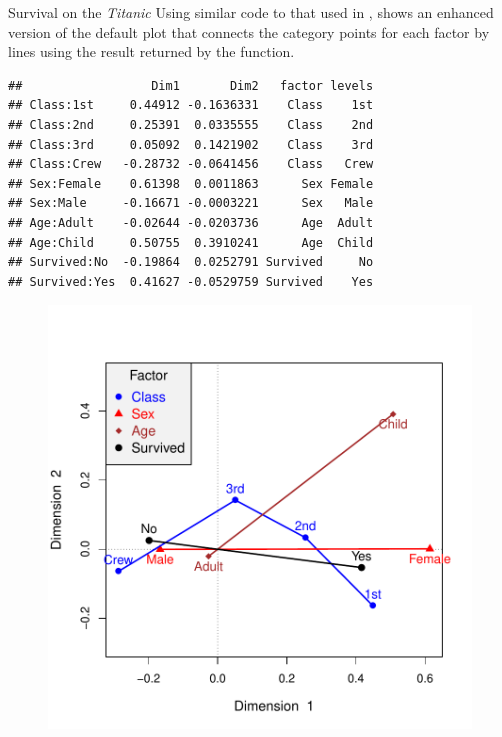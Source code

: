 \documentclass[11pt]{book}
\renewenvironment{knitrout}{\small\renewcommand{\baselinestretch}{.85}}{} %
\begin{document}
\begin{Example}[titanic2]{Survival on the \emph{Titanic}}
Using similar code to that used in ,
 shows an enhanced version of the default plot that connects
the category points for each factor by lines using the result returned by
the  function.
\begin{knitrout}
\color{fgcolor}\begin{kframe}
\begin{alltt}
 \hlkwb{<-} 
\end{alltt}
\end{kframe}
\end{knitrout}

\begin{knitrout}
\color{fgcolor}\begin{kframe}
\begin{verbatim}
##                  Dim1       Dim2   factor levels
## Class:1st     0.44912 -0.1636331    Class    1st
## Class:2nd     0.25391  0.0335555    Class    2nd
## Class:3rd     0.05092  0.1421902    Class    3rd
## Class:Crew   -0.28732 -0.0641456    Class   Crew
## Sex:Female    0.61398  0.0011863      Sex Female
## Sex:Male     -0.16671 -0.0003221      Sex   Male
## Age:Adult    -0.02644 -0.0203736      Age  Adult
## Age:Child     0.50755  0.3910241      Age  Child
## Survived:No  -0.19864  0.0252791 Survived     No
## Survived:Yes  0.41627 -0.0529759 Survived    Yes
\end{verbatim}
\end{kframe}\begin{figure}[!htb]


\centerline{\includegraphics[width=.8\textwidth]{ch06/fig/titanic-mca-plot} }


\end{figure}
\end{knitrout}
\end{Example}
\end{document}
